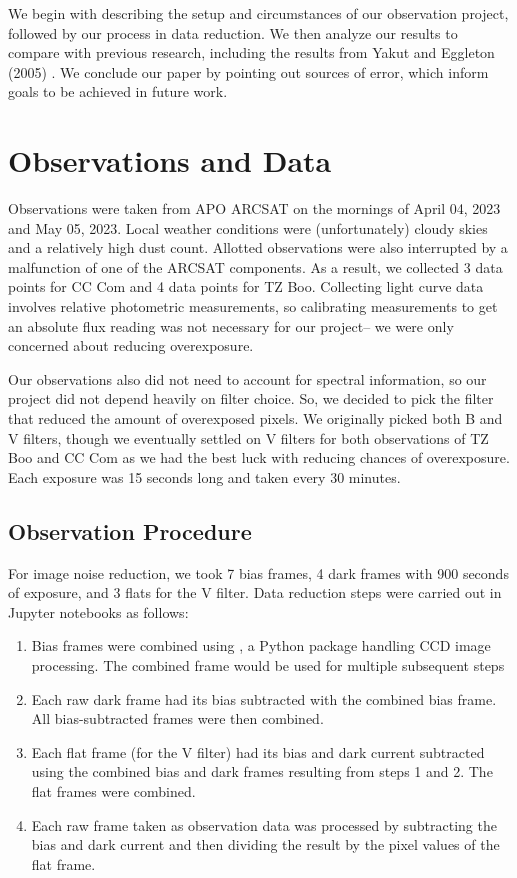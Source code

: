 \documentclass[12pt]{article}
\begin{document}
    We begin with describing the setup and circumstances of our observation project, followed by our process in data reduction. We then analyze our results to compare with previous research, including the results from Yakut and Eggleton (2005) \cite{2005ApJ...629.1055Y}. We conclude our paper by pointing out sources of error, which inform goals to be achieved in future work.

\section{Observations and Data}

Observations were taken from APO ARCSAT on the mornings of April 04, 2023 and May 05, 2023. Local weather conditions were (unfortunately) cloudy skies and a relatively high dust count. Allotted observations were also interrupted by a malfunction of one of the ARCSAT components. As a result, we collected 3 data points for CC Com and 4 data points for TZ Boo. Collecting light curve data involves relative photometric measurements, so calibrating measurements to get an absolute flux reading was not necessary for our project– we were only concerned about reducing overexposure. 

Our observations also did not need to account for spectral information, so our project did not depend heavily on filter choice. So, we decided to pick the filter that reduced the amount of overexposed pixels. We originally picked both B and V filters, though we eventually settled on V filters for both observations of TZ Boo and CC Com as we had the best luck with reducing chances of overexposure. Each exposure was 15 seconds long and taken every 30 minutes.

\subsection{Observation Procedure}
For image noise reduction, we took 7 bias frames, 4 dark frames with 900 seconds of exposure, and 3 flats for the V filter. Data reduction steps were carried out in Jupyter notebooks as follows:

\begin{enumerate}
    \item Bias frames were combined using , a Python package handling CCD image processing. The combined frame would be used for multiple subsequent steps
    \item Each raw dark frame had its bias subtracted with the combined bias frame. All bias-subtracted frames were then combined.
    \item Each flat frame (for the V filter) had its bias and dark current subtracted using the combined bias and dark frames resulting from steps 1 and 2. The flat frames were combined.
    \item Each raw frame taken as observation data was processed by subtracting the bias and dark current and then dividing the result by the pixel values of the flat frame. 
\end{enumerate}
\end{document}
